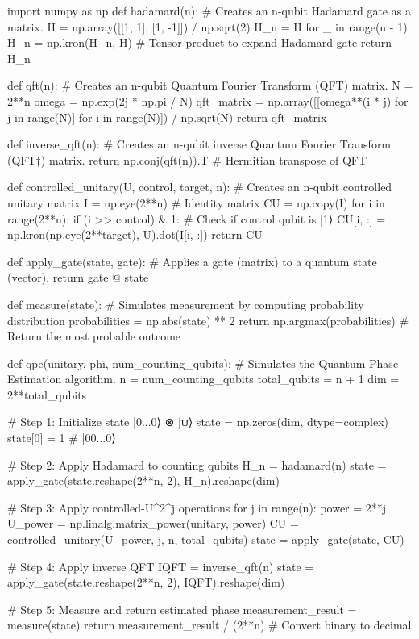 \documentclass[%
oneside,                 %
final,                   %
10pt]{article}
\begin{document}
\bpycode
import numpy as np
def hadamard(n):
   # Creates an n-qubit Hadamard gate as a matrix.
   H = np.array([[1, 1], [1, -1]]) / np.sqrt(2)
   H_n = H
   for _ in range(n - 1):
       H_n = np.kron(H_n, H)  # Tensor product to expand Hadamard gate
   return H_n

def qft(n):
   # Creates an n-qubit Quantum Fourier Transform (QFT) matrix.
   N = 2**n
   omega = np.exp(2j * np.pi / N)
   qft_matrix = np.array([[omega**(i * j) for j in range(N)] for i in range(N)]) / np.sqrt(N)
   return qft_matrix

def inverse_qft(n):
   # Creates an n-qubit inverse Quantum Fourier Transform (QFT†) matrix.
   return np.conj(qft(n)).T  # Hermitian transpose of QFT

def controlled_unitary(U, control, target, n):
   # Creates an n-qubit controlled unitary matrix
   I = np.eye(2**n)  # Identity matrix
   CU = np.copy(I)
   for i in range(2**n):
       if (i >> control) & 1:  # Check if control qubit is |1⟩
           CU[i, :] = np.kron(np.eye(2**target), U).dot(I[i, :])
   return CU

def apply_gate(state, gate):
   # Applies a gate (matrix) to a quantum state (vector).
   return gate @ state

def measure(state):
   # Simulates measurement by computing probability distribution
   probabilities = np.abs(state) ** 2
   return np.argmax(probabilities)  # Return the most probable outcome

def qpe(unitary, phi, num_counting_qubits):
   # Simulates the Quantum Phase Estimation algorithm.
   n = num_counting_qubits
   total_qubits = n + 1
   dim = 2**total_qubits

   # Step 1: Initialize state |0...0⟩ ⊗ |ψ⟩
   state = np.zeros(dim, dtype=complex)
   state[0] = 1  # |00...0⟩

   # Step 2: Apply Hadamard to counting qubits
   H_n = hadamard(n)
   state = apply_gate(state.reshape(2**n, 2), H_n).reshape(dim)

   # Step 3: Apply controlled-U^2^j operations
   for j in range(n):
       power = 2**j
       U_power = np.linalg.matrix_power(unitary, power)
       CU = controlled_unitary(U_power, j, n, total_qubits)
       state = apply_gate(state, CU)

   # Step 4: Apply inverse QFT
   IQFT = inverse_qft(n)
   state = apply_gate(state.reshape(2**n, 2), IQFT).reshape(dim)

   # Step 5: Measure and return estimated phase
   measurement_result = measure(state)
   return measurement_result / (2**n)  # Convert binary to decimal
\end{document}
